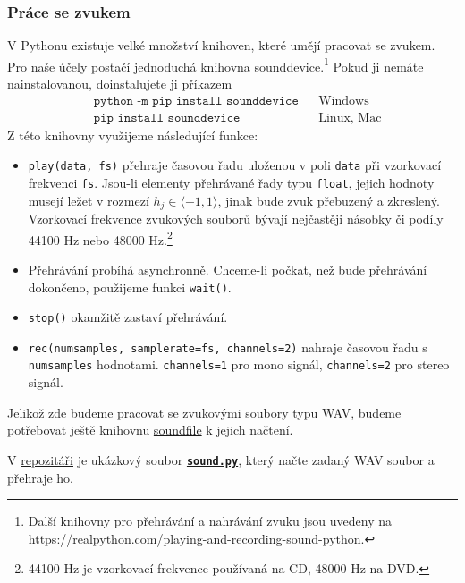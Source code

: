 \documentclass[a4paper,11pt,twoside]{article}
\def\code#1{\textnormal{\texttt{#1}}}
\def\ghfile#1#2{\textnormal{\textbf{\texttt{\href{https://github.com/PavelStransky/PCInPhysics/blob/main/#1#2}{#2}}}}}
\theoremstyle{red}
\theoremstyle{green}
\begin{document}
\subsubsection{Práce se zvukem}
\label{sec:Zvuk}
    V Pythonu existuje velké množství knihoven, které umějí pracovat se zvukem.
    Pro naše účely postačí jednoduchá knihovna \href{https://python-sounddevice.readthedocs.io}{sounddevice}.\footnote{
        Další knihovny pro přehrávání a nahrávání zvuku jsou uvedeny na \url{https://realpython.com/playing-and-recording-sound-python}.
    }
    Pokud ji nemáte nainstalovanou, doinstalujete ji příkazem
    \begin{align*}
        &\texttt{python -m pip install sounddevice}
        &&\text{Windows}\\
        &\texttt{pip install sounddevice}
        &&\text{Linux, Mac}
    \end{align*}
    Z této knihovny využijeme následující funkce:
    \begin{itemize}
        \item \code{play(data, fs)} 
            přehraje časovou řadu uloženou v poli \code{data} při vzorkovací frekvenci \code{fs}.
            Jsou-li elementy přehrávané řady typu \code{float}, jejich hodnoty musejí ležet v rozmezí $h_{j}\in\langle-1,1\rangle$, jinak bude zvuk přebuzený a zkreslený.
            Vzorkovací frekvence zvukových souborů bývají nejčastěji násobky či podíly 44100 Hz nebo 48000 Hz.\footnote{
                44100 Hz je vzorkovací frekvence používaná na CD, 48000 Hz na DVD.
            }
                            
        \item 
            Přehrávání probíhá asynchronně. 
            Chceme-li počkat, než bude přehrávání dokončeno, použijeme funkci \code{wait()}. 

        \item \code{stop()} okamžitě zastaví přehrávání.
        
        \item \code{rec(numsamples, samplerate=fs, channels=2)} nahraje časovou řadu s \code{numsamples} hodnotami. \code{channels=1} pro mono signál, \code{channels=2} pro stereo signál.
    \end{itemize}
    Jelikož zde budeme pracovat se zvukovými soubory typu WAV, budeme potřebovat ještě knihovnu \href{https://pysoundfile.readthedocs.io}{soundfile} k jejich načtení.

    V \href{https://github.com/PavelStransky/PCInPhysics}{repozitáři} je ukázkový soubor \ghfile{python/basics/}{sound.py}, který načte zadaný WAV soubor a přehraje ho. 
\end{document}
